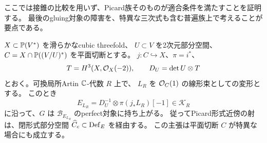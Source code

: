 ここでは接錐の比較を用いず、Picard族そのものが適合条件を満たすことを証明する。
最後のgluing対象の障害を、特異な三次式も含む普遍族上で考えることが要点である。

\begin{theorem}[Picard族の全次数の適合性]\label{thm:picard-compatible}
$X\subset\mathbb P(V^*)$ を滑らかなcubic threefold、
$U\subset V$ を2次元部分空間、$C=X\cap\mathbb P((V/U)^*)$ を平面切断とする。
$j:C\hookrightarrow X$、$\pi=i^*$、
\[
 T=H^3(X,\mathcal O_X(-2)),\qquad D_U=\det U\otimes T
\]
とおく。可換局所Artin $\mathbb C$-代数 $R$ 上で、
$L_R$ を $\mathcal O_C(1)$ の線形束としての変形とする。
このとき
\[
 E_{L_R}=D_U^{-1}\otimes\pi(j_*L_R)[-1]\in\mathcal K_R
\]
に沿って、$G$ は $\mathcal B_{E_{L_R}}$ のperfect対象に持ち上がる。
従ってPicard形式近傍の射は、閉形式部分空間
$\widehat C_c\subset\operatorname{Def}_E$ を経由する。
この主張は平面切断 $C$ が特異な場合にも成立する。
\end{theorem}

